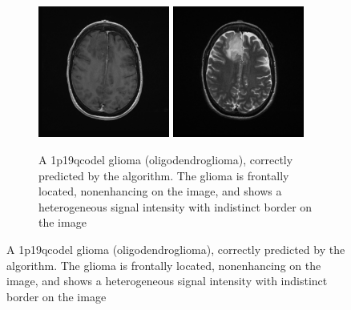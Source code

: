 \begin{figure}
     \centering
     \begin{subfigure}[b]{0.8\textwidth}
         \centering
         \includegraphics[width=0.475\textwidth]{Figures/LGG_104_codeleted_example_T1.png}
         \includegraphics[width=0.475\textwidth]{Figures/LGG_104_codeleted_example_T2.png}
         \caption{A \acl{1p19qcodel} glioma (oligodendroglioma), correctly predicted by the algorithm. The glioma is frontally located, nonenhancing on the   image, and shows a heterogeneous signal intensity with indistinct border on the   image}\label{fig:LGG_1p19q_example_codeleted}
     \end{subfigure}



\end{figure}
